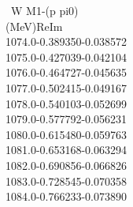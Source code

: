 \documentclass[a4paper,10pt]{article}
\def\bl{\phantom{0}}
\def\tt{\ttfamily}
\def\rm{\rmfamily}
\begin{document}
\tt
$\bl$\bl W \bl\bl\bl\bl\bl\bl\bl\bl M1-(p pi0)\\
(MeV)\bl\bl\bl\bl\bl\bl Re\bl\bl\bl\bl\bl\bl\bl\bl\bl\bl Im\\
1074.0\bl\bl\bl -0.389350\bl\bl\bl-0.038572\\
1075.0\bl\bl\bl -0.427039\bl\bl\bl-0.042104\\
1076.0\bl\bl\bl -0.464727\bl\bl\bl-0.045635\\
1077.0\bl\bl\bl -0.502415\bl\bl\bl-0.049167\\
1078.0\bl\bl\bl -0.540103\bl\bl\bl-0.052699\\
1079.0\bl\bl\bl -0.577792\bl\bl\bl-0.056231\\
1080.0\bl\bl\bl -0.615480\bl\bl\bl-0.059763\\
1081.0\bl\bl\bl -0.653168\bl\bl\bl-0.063294\\
1082.0\bl\bl\bl -0.690856\bl\bl\bl-0.066826\\
1083.0\bl\bl\bl -0.728545\bl\bl\bl-0.070358\\
1084.0\bl\bl\bl -0.766233\bl\bl\bl-0.073890\\
\rm
\end{document}
